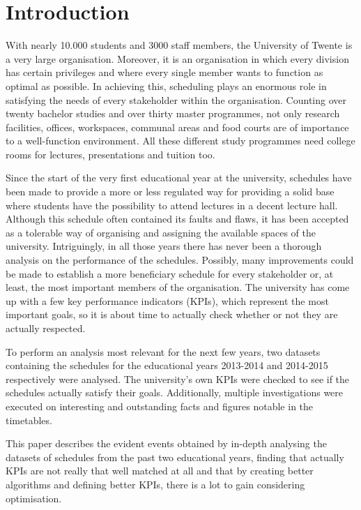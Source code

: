 \section{Introduction}
With nearly 10.000 students and 3000 staff members, the University of Twente is a very large organisation\cite{stats_uTwente}. Moreover, it is an organisation in which every division has certain privileges and where every single member wants to function as optimal as possible. In achieving this, scheduling plays an enormous role in satisfying the needs of every stakeholder within the organisation. Counting over twenty bachelor studies and over thirty master programmes, not only research facilities, offices, workspaces, communal areas and food courts are of importance to a well-function environment. All these different study programmes need college rooms for lectures, presentations and tuition too.

Since the start of the very first educational year at the university, schedules have been made to provide a more or less regulated way for providing a solid base where students have the possibility to attend lectures in a decent lecture hall. Although this schedule often contained its faults and flaws, it has been accepted as a tolerable way of organising and assigning the available spaces of the university. Intriguingly, in all those years there has never been a thorough analysis on the performance of the schedules. Possibly, many improvements could be made to establish a more beneficiary schedule for every stakeholder or, at least, the most important members of the organisation. The university has come up with a few key performance indicators (KPIs), which represent the most important goals, so it is about time to actually check whether or not they are actually respected.

To perform an analysis most relevant for the next few years, two datasets containing the schedules for the educational years 2013-2014 and 2014-2015 respectively were analysed. The university’s own KPIs were checked to see if the schedules actually satisfy their goals. Additionally, multiple investigations were executed on interesting and outstanding facts and figures notable in the timetables.

This paper describes the evident events obtained by in-depth analysing the datasets of schedules from the past two educational years, finding that actually KPIs are not really that well matched at all and that by creating better algorithms and defining better KPIs, there is a lot to gain considering optimisation.
